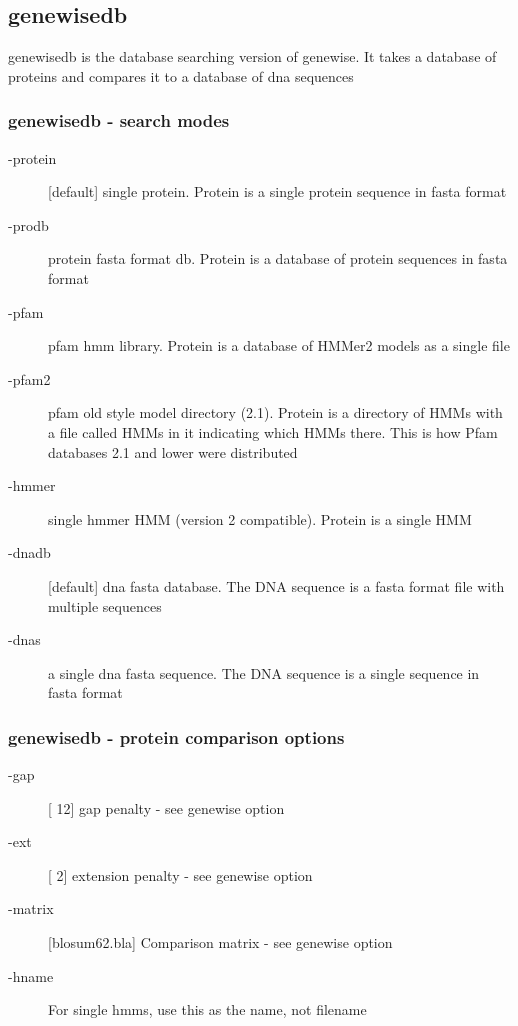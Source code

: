 \documentclass{article}
\begin{document}
\subsection{genewisedb}

genewisedb is the database searching version of genewise.  It takes a
database of proteins and compares it to a database of dna sequences
\subsubsection{genewisedb - search modes}
\begin{description}
\item[-protein]  [default] single protein. Protein is a single protein sequence in fasta format
\item[-prodb]    protein fasta format db. Protein is a database of protein sequences in fasta format
\item[-pfam]     pfam hmm library. Protein is a database of HMMer2 models as a single file 
\item[-pfam2]    pfam old style model directory (2.1). Protein is a directory of HMMs with a file
called HMMs in it indicating which HMMs there. This is how Pfam databases 2.1 and lower were distributed
\item[-hmmer]    single hmmer HMM (version 2 compatible). Protein is a single HMM
\item[-dnadb]    [default] dna fasta database. The DNA sequence is a fasta format
file with multiple sequences
\item[-dnas]     a single dna fasta sequence. The DNA sequence is a single sequence in fasta format
\end{description}
\subsubsection{genewisedb - protein comparison options}
\begin{description}
\item[-gap]    [ 12]  gap penalty - see genewise option
\item[-ext]    [  2]  extension penalty - see genewise option
\item[-matrix] [blosum62.bla]  Comparison matrix - see genewise option
\item[-hname]           For single hmms, use this as the name, not filename
\end{description}
\end{document}
